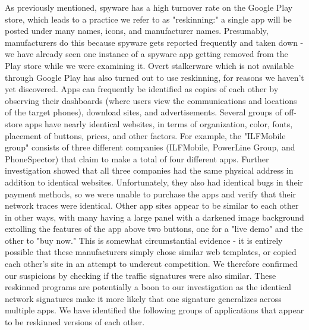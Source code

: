 \documentclass[acmtog]{acmart}
\begin{document}
As previously mentioned, spyware has a high turnover rate on the Google Play 
store, which leads to a practice we refer to as "reskinning:" a single app will 
be posted under many names, icons, and manufacturer names. Presumably, 
manufacturers do this because spyware gets reported frequently and taken down - 
we have already seen one instance of a spyware app getting removed from the 
Play store while we were examining it. Overt stalkerware which is not available 
through Google Play has also turned out to use reskinning, for reasons we 
haven't yet discovered. Apps can frequently be identified as copies of each 
other by observing their dashboards (where users view the communications and 
locations of the target phones), download sites, and advertisements. Several 
groups of off-store apps have nearly identical websites, in terms of 
organization, color, fonts, placement of buttons, prices, and other factors. 
For example, the "ILFMobile group" consists of three different companies 
(ILFMobile, PowerLine Group, and PhoneSpector) that claim to make a total of 
four different apps. Further investigation showed that all three companies had 
the same physical address in addition to identical websites. Unfortunately, 
they also had identical bugs in their payment methods, so we were unable to 
purchase the apps and verify that their network traces were identical. Other 
app sites appear to be similar to each other in other ways, 
with many having a large panel with a darkened image background extolling the 
features of the app above two buttons, one for a "live demo" and the other to 
"buy now." This is somewhat circumstantial evidence - it is entirely possible 
that these manufacturers simply chose similar web templates, or copied each 
other's site in an attempt to undercut competition. We therefore confirmed our 
suspicions by checking if the traffic signatures were also similar. These 
reskinned programs are potentially a boon to 
our investigation as the identical network signatures make it more likely that 
one signature generalizes across multiple apps. We have identified the 
following groups of applications that appear to be reskinned versions of each 
other.
\end{document}
